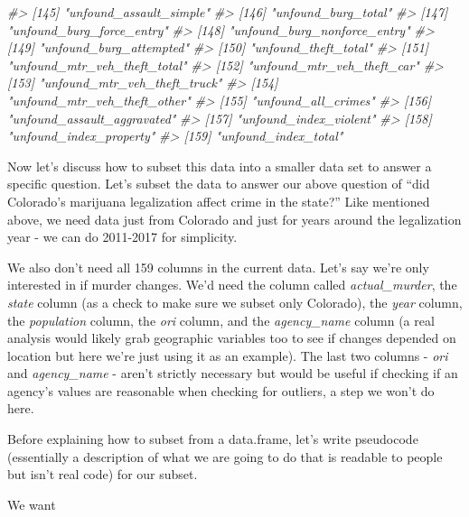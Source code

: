 \documentclass[
]{krantz}
\makeatletter
\newenvironment{Shaded}{\begin{snugshade}}{\end{snugshade}}
\newcommand{\CommentTok}[1]{\textcolor[rgb]{0.37,0.37,0.37}{\textit{#1}}}
\newenvironment{kframe}{%
\medskip{}
\setlength{\fboxsep}{.8em}
 \def\at@end@of@kframe{}%
 \ifinner\ifhmode%
  \def\at@end@of@kframe{\end{minipage}}%
  \begin{minipage}{\columnwidth}%
 \fi\fi%
 \def\FrameCommand##1{\hskip\@totalleftmargin \hskip-\fboxsep
 \colorbox{shadecolor}{##1}\hskip-\fboxsep
     \hskip-\linewidth \hskip-\@totalleftmargin \hskip\columnwidth}%
 \MakeFramed {\advance\hsize-\width
   \@totalleftmargin\z@ \linewidth\hsize
   \@setminipage}}%
 {\par\unskip\endMakeFramed%
 \at@end@of@kframe}
\renewenvironment{Shaded}{\begin{kframe}}{\end{kframe}}
\makeatother
\begin{document}
\begin{Shaded}
\begin{Highlighting}[]
\CommentTok{\#\textgreater{} [145] "unfound\_assault\_simple"        }
\CommentTok{\#\textgreater{} [146] "unfound\_burg\_total"            }
\CommentTok{\#\textgreater{} [147] "unfound\_burg\_force\_entry"      }
\CommentTok{\#\textgreater{} [148] "unfound\_burg\_nonforce\_entry"   }
\CommentTok{\#\textgreater{} [149] "unfound\_burg\_attempted"        }
\CommentTok{\#\textgreater{} [150] "unfound\_theft\_total"           }
\CommentTok{\#\textgreater{} [151] "unfound\_mtr\_veh\_theft\_total"   }
\CommentTok{\#\textgreater{} [152] "unfound\_mtr\_veh\_theft\_car"     }
\CommentTok{\#\textgreater{} [153] "unfound\_mtr\_veh\_theft\_truck"   }
\CommentTok{\#\textgreater{} [154] "unfound\_mtr\_veh\_theft\_other"   }
\CommentTok{\#\textgreater{} [155] "unfound\_all\_crimes"            }
\CommentTok{\#\textgreater{} [156] "unfound\_assault\_aggravated"    }
\CommentTok{\#\textgreater{} [157] "unfound\_index\_violent"         }
\CommentTok{\#\textgreater{} [158] "unfound\_index\_property"        }
\CommentTok{\#\textgreater{} [159] "unfound\_index\_total"}
\end{Highlighting}
\end{Shaded}

Now let's discuss how to subset this data into a smaller data set to answer a specific question. Let's subset the data to answer our above question of ``did Colorado's marijuana legalization affect crime in the state?'' Like mentioned above, we need data just from Colorado and just for years around the legalization year - we can do 2011-2017 for simplicity.

We also don't need all 159 columns in the current data. Let's say we're only interested in if murder changes. We'd need the column called \emph{actual\_murder}, the \emph{state} column (as a check to make sure we subset only Colorado), the \emph{year} column, the \emph{population} column, the \emph{ori} column, and the \emph{agency\_name} column (a real analysis would likely grab geographic variables too to see if changes depended on location but here we're just using it as an example). The last two columns - \emph{ori} and \emph{agency\_name} - aren't strictly necessary but would be useful if checking if an agency's values are reasonable when checking for outliers, a step we won't do here.

Before explaining how to subset from a data.frame, let's write pseudocode (essentially a description of what we are going to do that is readable to people but isn't real code) for our subset.

We want
\end{document}
